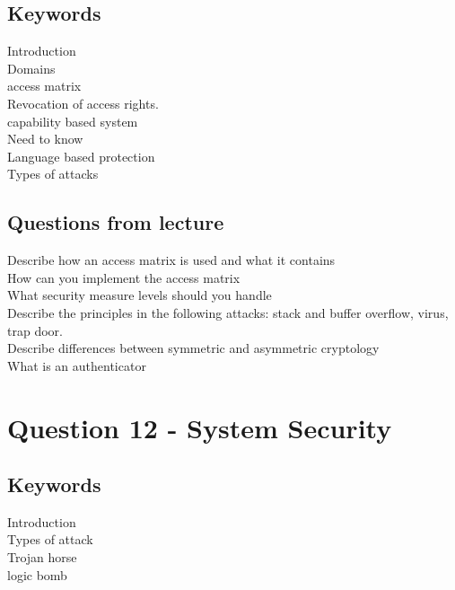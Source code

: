 \documentclass[a4paper,10pt,titlepage]{report}
\begin{document}
\subsection{Keywords}

Introduction \\
Domains \\
	access matrix \\
Revocation of access rights.\\
capability based system\\
	Need to know \\
Language based protection\\
Types of attacks \\



\subsection{Questions from lecture}

Describe how an access matrix is used and what it contains \\


How can you implement the access matrix \\

What security measure levels should you handle\\

Describe the principles in the following attacks: stack and buffer overflow, virus, trap door.\\

Describe differences between symmetric and asymmetric cryptology\\

What is an authenticator\\


\section{Question 12 - System Security }



\subsection{Keywords}

Introduction \\
Types of attack \\
	Trojan horse \\
	logic bomb \\
\end{document}
